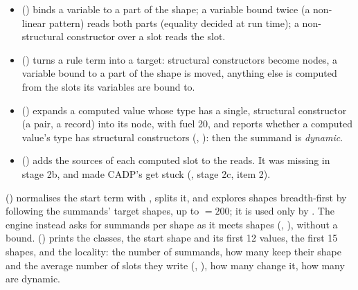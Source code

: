\begin{itemize}
\item {} () binds a
  variable to a part of the shape; a variable bound twice (a non-linear
  pattern) reads both parts (equality decided at run time); a
  non-structural constructor over a slot reads the slot.
\item {} () turns a rule
  term into a target: structural constructors become nodes, a variable
  bound to a part of the shape is moved, anything else is computed from
  the slots its variables are bound to.
\item {} () expands
  a computed value whose type has a single, structural constructor (a
  pair, a record) into its node, with fuel 20, and reports whether a
  computed value's type has structural constructors (,
  ): then the summand is
  \emph{dynamic}.
\item {} ()
  adds the sources of each computed slot to the reads. It was missing in
  stage 2b, and made CADP's  get stuck
  (, stage 2c, item 2).
\end{itemize}

 () normalises the
start term with , splits it, and explores shapes
breadth-first by following the summands' target shapes, up to
 $=200$; it is used only by .
The engine instead asks for summands per shape as it meets shapes
(, ), without
a bound.  () prints the
classes, the start shape and its first 12 values, the first 15 shapes,
and the locality: the number of summands, how many keep their shape and
the average number of slots they write (,
), how many change it, how many
are dynamic.


